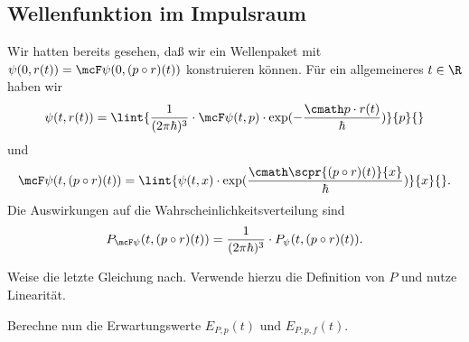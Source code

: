 \documentclass{subfiles}
\begin{document}
    \subsection{Wellenfunktion im Impulsraum}
        Wir hatten bereits gesehen, daß wir ein Wellenpaket mit $\psi(0,r(t)) = \mcF\psi(0,(p\circ r)(t))$ konstruieren können. Für ein allgemeineres $t\in\R$ haben wir 
        \[\psi(t,r(t)) = \lint{\frac{1}{(2\pi\hbar)^3}\cdot \mcF\psi(t,p)\cdot\exp(-\frac{\cmath p\cdot r(t)}{\hbar})}{p}{}\]
        und
        \[\mcF\psi(t,(p\circ r)(t)) = \lint{\psi(t,x)\cdot\exp(\frac{\cmath\scpr{(p\circ r)(t)}{x}}{\hbar})}{x}{}.\]
        Die Auswirkungen auf die Wahrscheinlichkeitsverteilung sind 
        \[P_{\mcF\psi}(t,(p\circ r)(t)) = \frac{1}{(2\pi\hbar)^3}\cdot P_\psi(t,(p\circ r)(t)).\]

        \begin{Aufgabe}
            \nr{} Weise die letzte Gleichung nach. Verwende hierzu die Definition von $P$ und nutze Linearität. 

            \nr{} Berechne nun die Erwartungswerte $E_{P,p}(t)$ und $E_{P,p,f}(t)$. 
        \end{Aufgabe}
\end{document}
